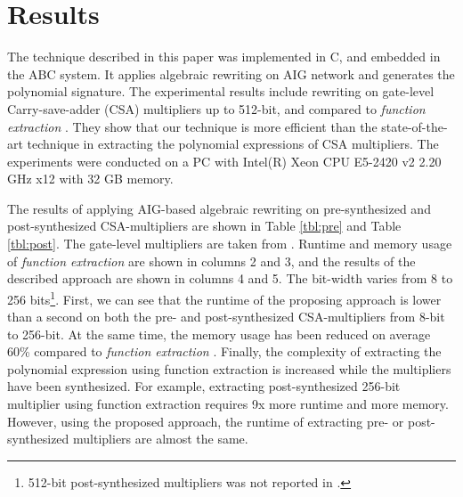 \section{Results}

The technique described in this paper was implemented in C, and embedded in the ABC system\cite{abc-link}. It applies algebraic rewriting on AIG network and generates the polynomial signature. The experimental results include rewriting on gate-level Carry-save-adder (CSA) multipliers up to 512-bit, and compared to \textit{function extraction} \cite{ciesielski2015verification}.
They show that our technique is more efficient than the state-of-the-art technique in extracting the polynomial expressions of CSA multipliers. The experiments were conducted on a PC with Intel(R) Xeon CPU E5-2420 v2 2.20 GHz x12 with 32 GB memory.

The results of applying AIG-based algebraic rewriting on pre-synthesized and post-synthesized CSA-multipliers are shown in Table \ref{tbl:pre} and Table \ref{tbl:post}. The gate-level multipliers are taken from \cite{ciesielski2015verification}. Runtime and memory usage of \textit{function extraction} \cite{ciesielski2015verification} are shown in columns 2 and 3, and the results of the described approach are shown in columns 4 and 5. The bit-width varies from 8 to 256 bits\footnote{512-bit post-synthesized multipliers was not reported in \cite{ciesielski2015verification}.}. First, we can see that the runtime of the proposing approach is lower than a second on both the pre- and post-synthesized CSA-multipliers from 8-bit to 256-bit. At the same time, the memory usage has been reduced on average 60\% compared to \textit{function extraction} \cite{ciesielski2015verification}. Finally, the complexity of extracting the polynomial expression using function extraction is increased while the multipliers have been synthesized. For example, extracting post-synthesized 256-bit multiplier using function extraction requires 9x more runtime and more memory. However, using the proposed approach, the runtime of extracting pre- or post-synthesized multipliers are almost the same.




%